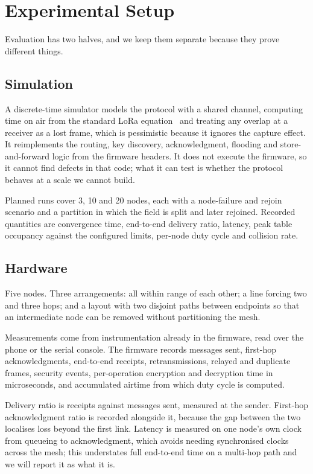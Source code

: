 \documentclass[conference]{IEEEtran}
\begin{document}
\section{Experimental Setup}\label{sec:setup}

Evaluation has two halves, and we keep them separate because they prove different
things.

\subsection{Simulation}

A discrete-time simulator models the protocol with a shared channel, computing
time on air from the standard LoRa equation~\cite{semtech2013toa} and treating
any overlap at a receiver as a lost frame, which is pessimistic because it
ignores the capture effect. It reimplements the routing, key discovery,
acknowledgment, flooding and store-and-forward logic from the firmware headers.
It does not execute the firmware, so it cannot find defects in that code; what it
can test is whether the protocol behaves at a scale we cannot build.

Planned runs cover 3, 10 and 20 nodes, each with a node-failure and rejoin
scenario and a partition in which the field is split and later rejoined.
Recorded quantities are convergence time, end-to-end delivery ratio, latency,
peak table occupancy against the configured limits, per-node duty cycle and
collision rate.

\subsection{Hardware}

Five nodes. Three arrangements: all within range of each other; a line forcing
two and three hops; and a layout with two disjoint paths between endpoints so
that an intermediate node can be removed without partitioning the mesh.

Measurements come from instrumentation already in the firmware, read over the
phone or the serial console. The firmware records messages sent, first-hop
acknowledgments, end-to-end receipts, retransmissions, relayed and duplicate
frames, security events, per-operation encryption and decryption time in
microseconds, and accumulated airtime from which duty cycle is computed.

Delivery ratio is receipts against messages sent, measured at the sender.
First-hop acknowledgment ratio is recorded alongside it, because the gap between
the two localises loss beyond the first link. Latency is measured on one node's
own clock from queueing to acknowledgment, which avoids needing synchronised
clocks across the mesh; this understates full end-to-end time on a multi-hop
path and we will report it as what it is.
\end{document}
